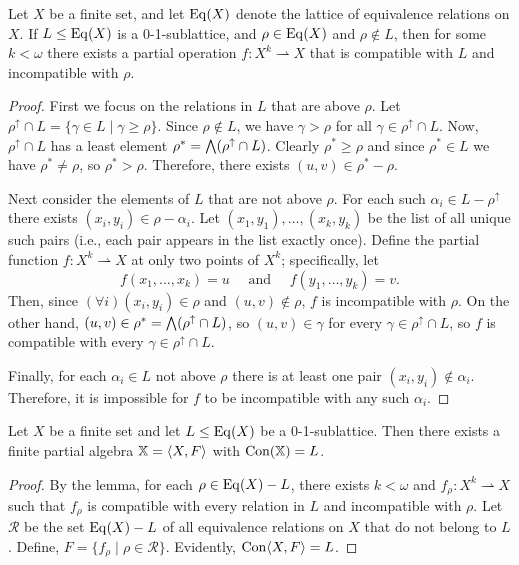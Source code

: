 \begin{lemma}
Let $X$ be a finite set, and let $\operatorname{Eq}(X)$ denote the lattice of equivalence
relations on $X$. If $L\leq \operatorname{Eq}(X)$ is a 0-1-sublattice,
and $\rho \in \operatorname{Eq}(X)$ and $\rho \notin L$, then for some $k < \omega$ there exists a partial
operation $f\colon X^k \rightharpoonup X$ that is compatible with $L$ and
incompatible with $\rho$.
\end{lemma}
\begin{proof}
  First we focus on the relations in $L$ that are above $\rho$.
  Let $\rho^\uparrow \cap L = \{\gamma \in L \mid \gamma \geq \rho\}$.
  Since $\rho\notin L$, we have $\gamma > \rho$ for all $\gamma \in \rho^\uparrow \cap L$.
  Now, $\rho^\uparrow \cap L$ has a least element
  $\rho^* = \bigwedge (\rho^\uparrow \cap L)$.  Clearly
  $\rho^*\geq \rho$ and since $\rho^* \in L$ we have
  $\rho^*\neq \rho$, so
  $\rho^* > \rho$.  Therefore, there exists $(u,v) \in \rho^* - \rho$.

  Next consider the elements of $L$ that are not above $\rho$. For each such
  $\alpha_i \in L - \rho^\uparrow$ there exists $(x_i, y_i) \in \rho -\alpha_i$.
  Let $(x_1, y_1), \dots, (x_k, y_k)$ be the list of all unique such pairs
  (i.e., each pair appears in the list exactly once).
  Define the partial function $f\colon X^k \rightharpoonup X$ at only two points of $X^k$; specifically, let
  \[ f(x_1, \dots, x_k) = u \quad \text{ and } \quad f(y_1, \dots, y_k) = v. \]
  Then, since $(\forall i)(x_i, y_i) \in \rho$ and $(u,v) \notin \rho$, 
  $f$ is incompatible with $\rho$.  On the other hand,
  $(u,v) \in  \rho^* = \bigwedge (\rho^\uparrow \cap L)$, so
  $(u,v) \in \gamma$  for every $\gamma \in \rho^\uparrow \cap L$, so
  $f$ is compatible with every $\gamma \in \rho^\uparrow \cap L$.
  
  
  Finally, for each $\alpha_i\in L$ not above $\rho$ there is at least one pair
  $(x_i, y_i)\notin \alpha_i$.  Therefore, it is impossible for $f$ to be
  incompatible with any such $\alpha_i$. 
\end{proof}

\begin{theorem}
Let $X$ be a finite set and let $L\leq \operatorname{Eq}(X)$ be a 0-1-sublattice.
Then there exists a finite partial algebra
$\mathbb X = \langle X, F\rangle$ with $\operatorname{Con}(\mathbb X) =  L$.
\end{theorem}

\begin{proof}
  By the lemma, for each $\rho \in \operatorname{Eq}(X) - L$, there exists $k< \omega$ and
  $f_\rho \colon  X^k \rightharpoonup X$ such that $f_\rho$ is compatible with every relation in
  $L$ and incompatible with $\rho$.  Let $\mathcal{R}$ be the set $\operatorname{Eq}(X) - L$ of
  all equivalence relations on $X$ that do not belong to $L$.  Define,
  $F = \{f_\rho \mid \rho \in \mathcal{R}\}$.  Evidently, $\operatorname{Con} \langle X, F\rangle = L$.
\end{proof}

